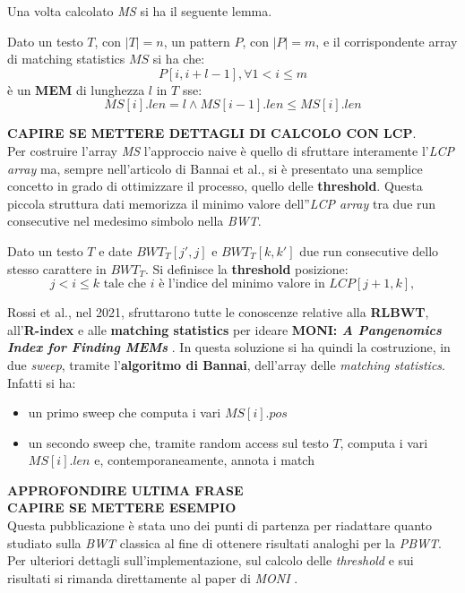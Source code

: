 Una volta calcolato \textit{MS} si ha il seguente lemma.
\begin{lemma}
  Dato un testo $T$, con $|T|=n$, un pattern $P$, con $|P|=m$, e il
  corrispondente array di matching statistics $MS$ si ha che:
  \[P[i,i+l-1],\forall 1<i\leq m\]
  è un \textbf{MEM} di lunghezza $l$ in $T$ sse:
  \[MS[i].len=l\land MS[i-1].len\leq MS[i].len\]
\end{lemma}
\textbf{CAPIRE SE METTERE DETTAGLI DI CALCOLO CON LCP}.\\
Per costruire l'array \textit{MS} l'approccio naive è quello di sfruttare
interamente l'\textit{LCP array} ma, sempre nell'articolo di Bannai et
al.\cite{bannai}, si è presentato una semplice concetto in grado di
ottimizzare il processo, quello delle \textbf{threshold}. Questa piccola
struttura dati memorizza il minimo valore dell''\textit{LCP array} tra due run
consecutive nel medesimo simbolo nella \textit{BWT}.
\begin{definizione}
  Dato un testo $T$ e date $BWT_T[j',j]$ e $BWT_T[k,k']$ due run consecutive
  dello stesso carattere in $BWT_T$. Si definisce la \textbf{threshold}
  posizione:
  \[j< i \leq k\mbox{ tale che } i\mbox{ è l'indice del minimo valore in
    }LCP[j+1,k],\] 
\end{definizione}
Rossi et al., nel 2021, sfruttarono tutte le conoscenze relative
alla \textbf{RLBWT}, all'\textbf{R-index} e alle \textbf{matching statistics}
per ideare \textbf{MONI:\textit{ A Pangenomics Index for Finding MEMs}}
\cite{moni}. In questa soluzione si ha quindi la costruzione, in due
\textit{sweep}, tramite l'\textbf{algoritmo di Bannai}, dell'array delle
\textit{matching statistics}. Infatti si ha:
\begin{itemize}
  \item un primo sweep che computa i vari $MS[i].pos$
  \item un secondo sweep che, tramite random access sul testo $T$, computa i
  vari $MS[i].len$ e, contemporaneamente, annota i match
\end{itemize}
\textbf{APPROFONDIRE ULTIMA FRASE}\\
\textbf{CAPIRE SE METTERE ESEMPIO}\\
Questa pubblicazione è stata uno dei punti di partenza per
riadattare quanto studiato sulla \textit{BWT} classica al fine di ottenere
risultati analoghi per la \textit{PBWT}.\\
Per ulteriori dettagli sull'implementazione, sul calcolo delle
\textit{threshold} e sui risultati si rimanda direttamente al paper di
\textit{MONI} \cite{moni}.
